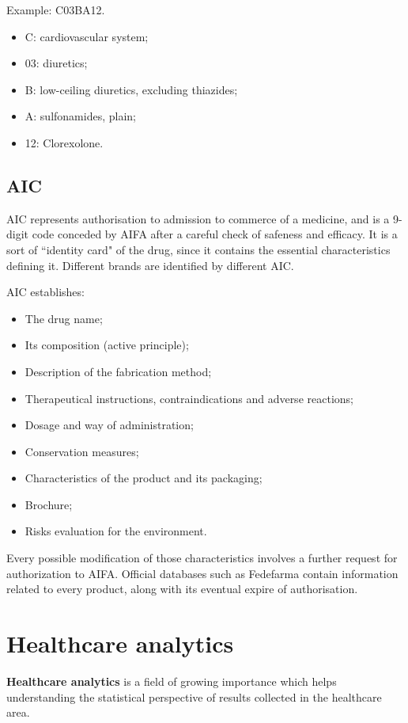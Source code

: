 Example: C03BA12.
\begin{itemize}
	\item C: cardiovascular system;
		\item 03: diuretics;
			\item B: low-ceiling diuretics, excluding thiazides;
				\item A: sulfonamides, plain;
					\item 12: Clorexolone.
\end{itemize}

\subsection{AIC}
AIC represents authorisation to admission to commerce of a medicine, and is a 9-digit code conceded by AIFA after a careful check of safeness and efficacy. It is a sort of ``identity card" of the drug, since it contains the essential characteristics defining it\cite{aicdef}. Different brands are identified by different AIC.

AIC establishes:
\begin{itemize}
	\item The drug name;
	\item Its composition (active principle);
	\item Description of the fabrication method;
	\item Therapeutical instructions, contraindications and adverse reactions;
	\item Dosage and way of administration;
	 \item Conservation measures;
	 \item Characteristics of the product and its packaging;
	 \item Brochure;
	 \item Risks evaluation for the environment.
\end{itemize}

Every possible modification of those characteristics involves a further request for authorization to AIFA. Official databases such as Fedefarma contain information related to every product, along with its eventual expire of authorisation.

\section{Healthcare analytics}
\textbf{Healthcare analytics} is a field of growing importance which helps understanding the statistical perspective of results collected in the healthcare area. 

